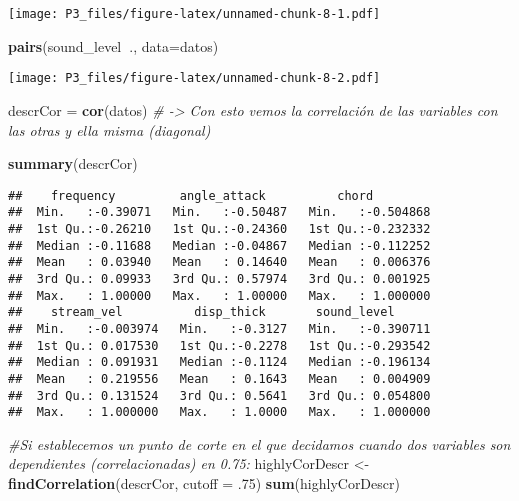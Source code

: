 \documentclass[]{article}
\newenvironment{Shaded}{\begin{snugshade}}{\end{snugshade}}
\newcommand{\KeywordTok}[1]{\textcolor[rgb]{0.13,0.29,0.53}{\textbf{#1}}}
\newcommand{\DataTypeTok}[1]{\textcolor[rgb]{0.13,0.29,0.53}{#1}}
\newcommand{\DecValTok}[1]{\textcolor[rgb]{0.00,0.00,0.81}{#1}}
\newcommand{\StringTok}[1]{\textcolor[rgb]{0.31,0.60,0.02}{#1}}
\newcommand{\CommentTok}[1]{\textcolor[rgb]{0.56,0.35,0.01}{\textit{#1}}}
\newcommand{\OperatorTok}[1]{\textcolor[rgb]{0.81,0.36,0.00}{\textbf{#1}}}
\newcommand{\NormalTok}[1]{#1}
\begin{document}
\texttt{[image: P3\_files/figure-latex/unnamed-chunk-8-1.pdf]}

\begin{Shaded}
\begin{Highlighting}[]
\KeywordTok{pairs}\NormalTok{(sound_level}\OperatorTok{~}\NormalTok{., }\DataTypeTok{data=}\NormalTok{datos)}
\end{Highlighting}
\end{Shaded}

\texttt{[image: P3\_files/figure-latex/unnamed-chunk-8-2.pdf]}

\begin{Shaded}
\begin{Highlighting}[]
\NormalTok{descrCor =}\StringTok{ }\KeywordTok{cor}\NormalTok{(datos) }\CommentTok{# -> Con esto vemos la correlación de las variables con las otras y ella misma (diagonal)}

\KeywordTok{summary}\NormalTok{(descrCor)}
\end{Highlighting}
\end{Shaded}

\begin{verbatim}
##    frequency         angle_attack          chord          
##  Min.   :-0.39071   Min.   :-0.50487   Min.   :-0.504868  
##  1st Qu.:-0.26210   1st Qu.:-0.24360   1st Qu.:-0.232332  
##  Median :-0.11688   Median :-0.04867   Median :-0.112252  
##  Mean   : 0.03940   Mean   : 0.14640   Mean   : 0.006376  
##  3rd Qu.: 0.09933   3rd Qu.: 0.57974   3rd Qu.: 0.001925  
##  Max.   : 1.00000   Max.   : 1.00000   Max.   : 1.000000  
##    stream_vel          disp_thick       sound_level       
##  Min.   :-0.003974   Min.   :-0.3127   Min.   :-0.390711  
##  1st Qu.: 0.017530   1st Qu.:-0.2278   1st Qu.:-0.293542  
##  Median : 0.091931   Median :-0.1124   Median :-0.196134  
##  Mean   : 0.219556   Mean   : 0.1643   Mean   : 0.004909  
##  3rd Qu.: 0.131524   3rd Qu.: 0.5641   3rd Qu.: 0.054800  
##  Max.   : 1.000000   Max.   : 1.0000   Max.   : 1.000000
\end{verbatim}

\begin{Shaded}
\begin{Highlighting}[]
\CommentTok{#Si establecemos un punto de corte en el que decidamos cuando dos variables son dependientes (correlacionadas) en 0.75:}
\NormalTok{highlyCorDescr <-}\StringTok{ }\KeywordTok{findCorrelation}\NormalTok{(descrCor, }\DataTypeTok{cutoff =}\NormalTok{ .}\DecValTok{75}\NormalTok{)}
\KeywordTok{sum}\NormalTok{(highlyCorDescr)}
\end{Highlighting}
\end{Shaded}
\end{document}
